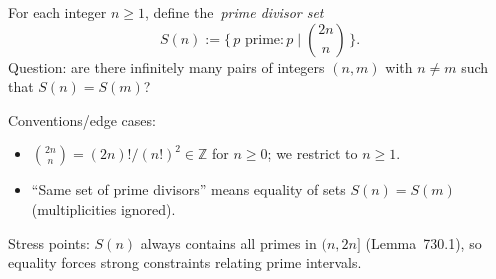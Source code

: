 For each integer $n\ge 1$, define the \,\emph{prime divisor set}\,
\[
S(n) := \{\,p\text{ prime}: p\mid \binom{2n}{n}\,\}.
\]
Question: are there infinitely many pairs of integers $(n,m)$ with $n\neq m$ such that $S(n)=S(m)$?

Conventions/edge cases:
\begin{itemize}
\item $\binom{2n}{n}=(2n)!/(n!)^2\in\mathbb Z$ for $n\ge 0$; we restrict to $n\ge 1$.
\item ``Same set of prime divisors'' means equality of sets $S(n)=S(m)$ (multiplicities ignored).
\end{itemize}
Stress points: $S(n)$ always contains all primes in $(n,2n]$ (Lemma~730.1), so equality forces strong constraints relating prime intervals.
